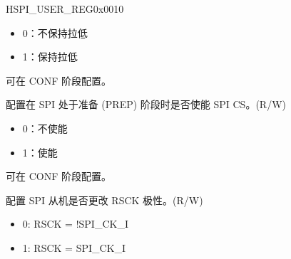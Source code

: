 \begin{register}{H}{SPI\_USER\_REG}{0x0010}
\begin{regdesc}
\begin{reglist}
\begin{itemize}
    \item 0：不保持拉低
    \item 1：保持拉低
\end{itemize}
可在 CONF 阶段配置。 
\label{fielddesc:SPICSSETUP}\item [SPI\_CS\_SETUP] 配置在 SPI 处于准备 (PREP) 阶段时是否使能 SPI CS。(R/W)\\
\begin{itemize}
    \item 0：不使能
    \item 1：使能
\end{itemize}
可在 CONF 阶段配置。
\label{fielddesc:SPIRSCKIEDGE}\item [SPI\_RSCK\_I\_EDGE] 配置 SPI 从机是否更改 RSCK 极性。(R/W)\\
\begin{itemize}
    \item 0: RSCK = !SPI\_CK\_I
    \item 1: RSCK = SPI\_CK\_I
\end{itemize}

\item [见下页]
\end{reglist}\end{regdesc}
\end{register}

